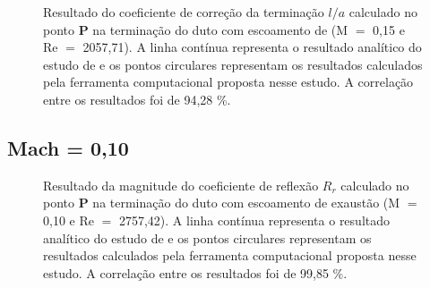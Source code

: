 \newpage
\begin{figure}[ht!]
\centering
  \caption[Coeficiente de Correção da Terminação $l/a$ com Escoamento de Exaustão (M $=$ 0,15)]{Resultado do coeficiente de correção da terminação $l/a$ calculado no ponto $\textbf{P}$ na terminação do duto com escoamento de (M $=$ 0,15 e Re $=$ 2057,71). A linha contínua representa o resultado analítico do estudo de  e os pontos circulares representam os resultados calculados pela ferramenta computacional proposta nesse estudo. A correlação entre os resultados foi de 94,28 \%.}
  \label{fig:loa_boca_015}
\end{figure}

\newpage
\subsection{Mach = 0,10}

\begin{figure}[ht!]
\centering
  \caption[Coeficiente de Reflexão $R_{r}$ com Escoamento de Exaustão (M $=$ 0,10)]{Resultado da magnitude do coeficiente de reflexão $R_{r}$ calculado no ponto $\textbf{P}$ na terminação do duto com escoamento de exaustão (M $=$ 0,10 e Re $=$ 2757,42). A linha contínua representa o resultado analítico do estudo de  e os pontos circulares representam os resultados calculados pela ferramenta computacional proposta nesse estudo. A correlação entre os resultados foi de 99,85 \%.}
  \label{fig:abs_r_boca_010}
\end{figure}

